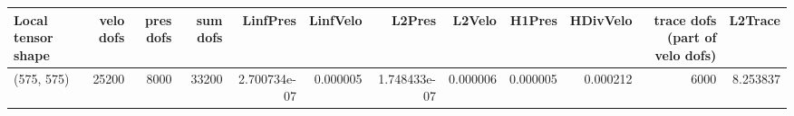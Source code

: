 \begin{tabular}{lrrrrrrrrrrr}
\toprule
Local tensor shape &  velo dofs &  pres dofs &  sum dofs &     LinfPres &  LinfVelo &       L2Pres &   L2Velo &   H1Pres &  HDivVelo &  trace dofs (part of velo dofs) &  L2Trace \\
\midrule
        (575, 575) &      25200 &       8000 &     33200 & 2.700734e-07 &  0.000005 & 1.748433e-07 & 0.000006 & 0.000005 &  0.000212 &                            6000 & 8.253837 \\
\bottomrule
\end{tabular}
